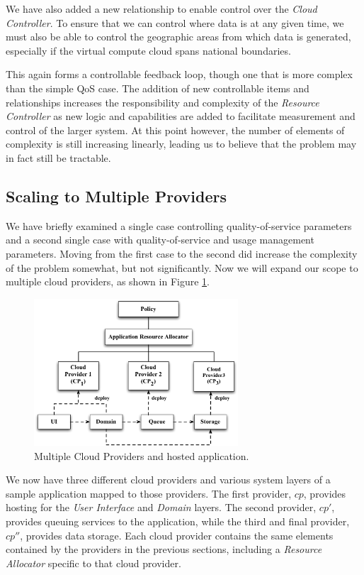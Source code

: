 \documentclass[10pt,letterpaper]{book}
\begin{document}
We have also added a new relationship to enable control over the \textit{Cloud Controller}.  To ensure that we can control where data is at any given time, we must also be able to control the geographic areas from which data is generated, especially if the virtual compute cloud spans national boundaries.

This again forms a controllable feedback loop, though one that is more complex than the simple QoS case.  The addition of new controllable items and relationships increases the responsibility and complexity of the \textit{Resource Controller} as new logic and capabilities are added to facilitate measurement and control of the larger system.  At this point however, the number of elements of complexity is still increasing linearly, leading us to believe that the problem may in fact still be tractable.

\subsection{Scaling to Multiple Providers}\label{sec:multiple}
We have briefly examined a single case controlling quality-of-service parameters and a second single case with quality-of-service and usage management parameters.  Moving from the first case to the second did increase the complexity of the problem somewhat, but not significantly.  Now we will expand our scope to multiple cloud providers, as shown in Figure \ref{fig:multiple}.

\begin{figure}[!t]
\centering
\includegraphics[width=3in]{Multiple}
\caption{Multiple Cloud Providers and hosted application.}
\label{fig:multiple}
\end{figure}

We now have three different cloud providers and various system layers of a sample application mapped to those providers.  The first provider, $ cp $, provides hosting for the \textit{User Interface} and \textit{Domain} layers.  The second provider, $ cp' $, provides queuing services to the application, while the third and final provider, $ cp'' $, provides data storage.  Each cloud provider contains the same elements contained by the providers in the previous sections, including a \textit{Resource Allocator} specific to that cloud provider.
\end{document}
